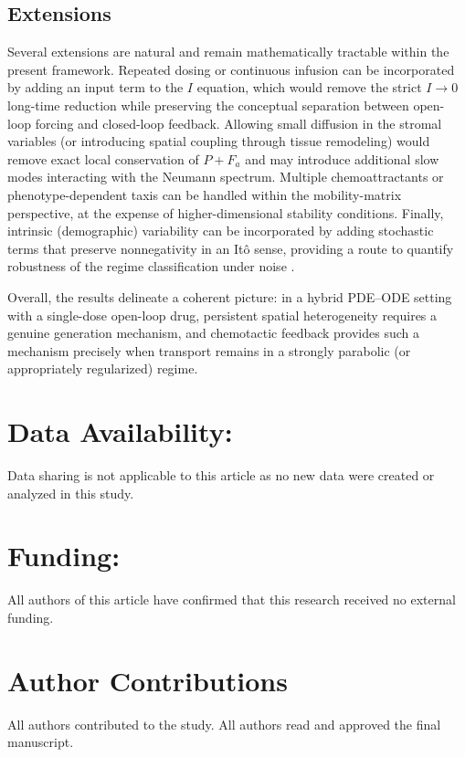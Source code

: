 \documentclass[pdflatex,sn-mathphys-ay]{sn-jnl}
\theoremstyle{thmstyleone}
\theoremstyle{definition}
\theoremstyle{remark}
\begin{document}
\subsection{Extensions}
Several extensions are natural and remain mathematically tractable within the present framework. 
Repeated dosing or continuous infusion can be incorporated by adding an input term to the $I$ equation, which would remove the strict $I\to0$ long-time reduction while preserving the conceptual separation between open-loop forcing and closed-loop feedback. 
Allowing small diffusion in the stromal variables (or introducing spatial coupling through tissue remodeling) would remove exact local conservation of $P+F_a$ and may introduce additional slow modes interacting with the Neumann spectrum. 
Multiple chemoattractants or phenotype-dependent taxis can be handled within the mobility-matrix perspective, at the expense of higher-dimensional stability conditions. 
Finally, intrinsic (demographic) variability can be incorporated by adding stochastic terms that preserve nonnegativity in an It\^o sense, providing a route to quantify robustness of the regime classification under noise \citep{abundo1991stochastic,wang2025analysis}.

Overall, the results delineate a coherent picture: in a hybrid PDE--ODE setting with a single-dose open-loop drug, persistent spatial heterogeneity requires a genuine generation mechanism, and chemotactic feedback provides such a mechanism precisely when transport remains in a strongly parabolic (or appropriately regularized) regime.

\backmatter

\section*{Data Availability:}
Data sharing is not applicable to this article as no new data were created or analyzed in this study.

\section*{Funding:}
All authors of this article have confirmed that this research received no external funding.

\section*{Author Contributions}
All authors contributed to the study. All authors read and approved the final
manuscript.
\end{document}
